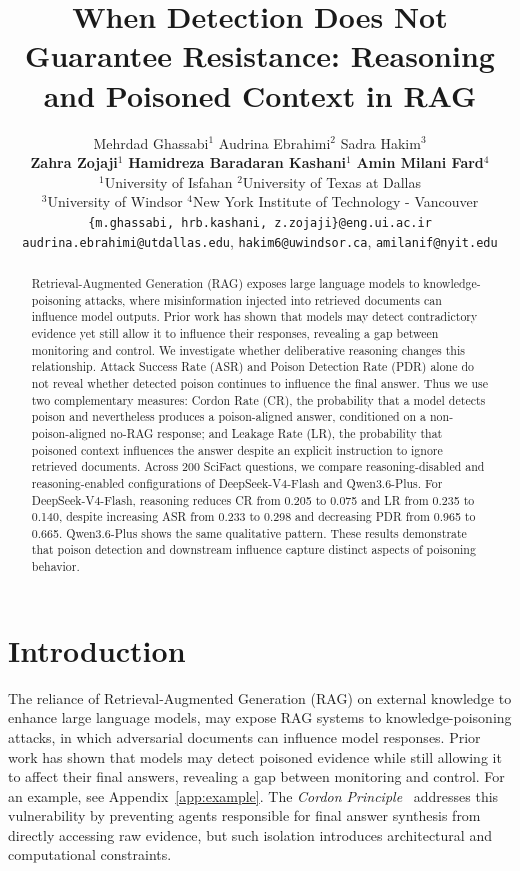 \documentclass[11pt]{article}
\title{When Detection Does Not Guarantee Resistance: Reasoning and Poisoned Context in RAG}
\author{
  Mehrdad Ghassabi$^1$ \quad Audrina Ebrahimi$^2$ \quad Sadra Hakim$^3$ \\
  \textbf{Zahra Zojaji}$^1$ \quad \textbf{Hamidreza Baradaran Kashani}$^1$ \quad \textbf{Amin Milani Fard}$^4$ \\[0.5em]
  $^1$University of Isfahan \quad $^2$University of Texas at Dallas \\
  $^3$University of Windsor \quad $^4$New York Institute of Technology - Vancouver \\[0.5em]
  \texttt{\{m.ghassabi, hrb.kashani, z.zojaji\}@eng.ui.ac.ir} \\
  \texttt{audrina.ebrahimi@utdallas.edu}, \texttt{hakim6@uwindsor.ca},
  \texttt{amilanif@nyit.edu}
}
\begin{document}
\maketitle

\begin{abstract}
Retrieval-Augmented Generation (RAG) exposes large language models to knowledge-poisoning attacks, where misinformation injected into retrieved documents can influence model outputs. Prior work has shown that models may detect contradictory evidence yet still allow it to influence their responses, revealing a gap between monitoring and control. We investigate whether deliberative reasoning changes this relationship. Attack Success Rate (ASR) and Poison Detection Rate (PDR) alone do not reveal whether detected poison continues to influence the final answer. Thus we use two complementary measures: Cordon Rate (CR), the probability that a model detects poison and nevertheless produces a poison-aligned answer, conditioned on a non-poison-aligned no-RAG response; and Leakage Rate (LR), the probability that poisoned context influences the answer despite an explicit instruction to ignore retrieved documents. Across 200 SciFact questions, we compare reasoning-disabled and reasoning-enabled configurations of DeepSeek-V4-Flash and Qwen3.6-Plus. For DeepSeek-V4-Flash, reasoning reduces CR from 0.205 to 0.075 and LR from 0.235 to 0.140, despite increasing ASR from 0.233 to 0.298 and decreasing PDR from 0.965 to 0.665. Qwen3.6-Plus shows the same qualitative pattern. These results demonstrate that poison detection and downstream influence capture distinct aspects of poisoning behavior.
\end{abstract}

\section{Introduction}

The reliance of Retrieval-Augmented Generation (RAG) on external knowledge to enhance large language models, may expose RAG systems to knowledge-poisoning attacks, in which adversarial documents can influence model responses. Prior work has shown that models may detect poisoned evidence while still allowing it to affect their final answers, revealing a gap between monitoring and control. For an example, see Appendix~\ref{app:example}. The \emph{Cordon Principle}~\cite{yu2026cordonmasdefendingragknowledge} addresses this vulnerability by preventing agents responsible for final answer synthesis from directly accessing raw evidence, but such isolation introduces architectural and computational constraints.
\end{document}
